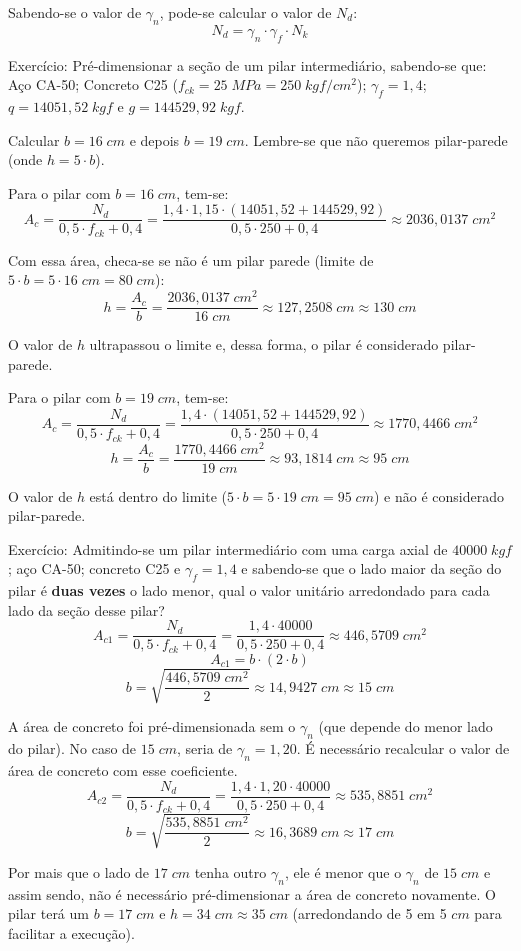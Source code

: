 Sabendo-se o valor de $\gamma_n$, pode-se calcular o valor de $N_d$:
\begin{equation}N_d=\gamma_n\cdot\gamma_f\cdot N_k\end{equation}

Exercício: Pré-dimensionar a seção de um pilar intermediário, sabendo-se que: Aço CA-50; Concreto C25 ($f_{ck}=25\;MPa=250\;kgf/{cm}^2$); $\gamma_f=1,4$; $q=14051,52\;kgf$ e $g=144529,92\;kgf$.

Calcular $b=16\;cm$ e depois $b=19\;cm$. Lembre-se que não queremos pilar-parede (onde $h=5\cdot b$).

Para o pilar com $b=16\;cm$, tem-se:
$$A_c=\frac{N_d}{0,5\cdot f_{ck}+0,4}=\frac{1,4\cdot1,15\cdot(14051,52+144529,92)}{0,5\cdot250+0,4}\approx2036,0137\;{cm}^2$$

Com essa área, checa-se se não é um pilar parede (limite de $5\cdot b=5\cdot16\;cm=80\;cm$):
$$h=\frac{A_c}{b}=\frac{2036,0137\;{cm}^2}{16\;cm}\approx127,2508\;cm\approx130\;cm$$

O valor de $h$ ultrapassou o limite e, dessa forma, o pilar é considerado pilar-parede.

Para o pilar com $b=19\;cm$, tem-se:
$$A_c=\frac{N_d}{0,5\cdot f_{ck}+0,4}=\frac{1,4\cdot(14051,52+144529,92)}{0,5\cdot250+0,4}\approx1770,4466\;{cm}^2$$
$$h=\frac{A_c}{b}=\frac{1770,4466\;{cm}^2}{19\;cm}\approx93,1814\;cm\approx95\;cm$$

O valor de $h$ está dentro do limite ($5\cdot b=5\cdot19\;cm=95\;cm$) e não é considerado pilar-parede.

Exercício: Admitindo-se um pilar intermediário com uma carga axial de $40000\;kgf$; aço CA-50; concreto C25 e $\gamma_f=1,4$ e sabendo-se que o lado maior da seção do pilar é \textbf{duas vezes} o lado menor, qual o valor unitário arredondado para cada lado da seção desse pilar?
$$A_{c1}=\frac{N_d}{0,5\cdot f_{ck}+0,4}=\frac{1,4\cdot40000}{0,5\cdot250+0,4}\approx446,5709\;{cm}^2$$
$$A_{c1}=b\cdot(2\cdot b)$$
$$b=\sqrt{\frac{446,5709\;{cm}^2}{2}}\approx14,9427\;cm\approx15\;cm$$

A área de concreto foi pré-dimensionada sem o $\gamma_n$ (que depende do menor lado do pilar). No caso de $15\;cm$, seria de $\gamma_n=1,20$. É necessário recalcular o valor de área de concreto com esse coeficiente.
$$A_{c2}=\frac{N_d}{0,5\cdot f_{ck}+0,4}=\frac{1,4\cdot1,20\cdot40000}{0,5\cdot250+0,4}\approx535,8851\;{cm}^2$$
$$b=\sqrt{\frac{535,8851\;{cm}^2}{2}}\approx16,3689\;cm\approx17\;cm$$

Por mais que o lado de $17\;cm$ tenha outro $\gamma_n$, ele é menor que o $\gamma_n$ de $15\;cm$ e assim sendo, não é necessário pré-dimensionar a área de concreto novamente. O pilar terá um $b=17\;cm$ e $h=34\;cm\approx35\;cm$ (arredondando de 5 em 5 $cm$ para facilitar a execução).